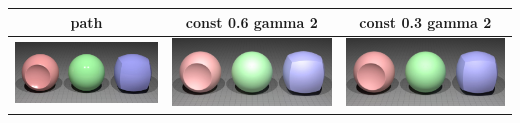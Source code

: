 \documentclass[11pt]{article}
\begin{document}
\begin{table}[ht]
  \centering
  \begin{tabular}{ | c | c | c |}
    \hline
    path & const 0.6 gamma 2 & const 0.3 gamma 2 \\ \hline
    \begin{minipage}{.3\textwidth}
      \includegraphics[scale=0.1]{img/obj/basic_pl/basic_pl.jpg}
    \end{minipage}
    &
    \begin{minipage}{.3\textwidth}
      \includegraphics[scale=0.1]{img/obj/basic_pl/basic_pl_disney.jpg}
    \end{minipage}
    & 
    \begin{minipage}{.3\textwidth}
      \includegraphics[scale=0.1]{img/obj/basic_pl/basic_pl_disney_dc03.jpg}
    \end{minipage}
    \\ \hline
  \end{tabular}
\end{table}
\end{document}
